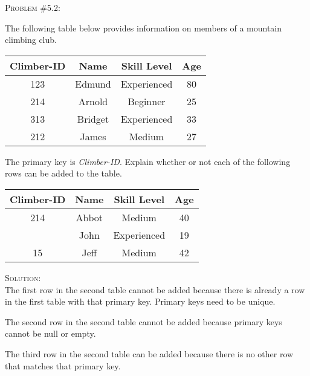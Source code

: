 \documentclass[12pt]{article}
\newenvironment{problem}[1]
{\begin{mdframed}[linewidth=0.8pt]
        \textsc{Problem #1:}

}
    {\end{mdframed}}
\newenvironment{solution}
    {\textsc{Solution:}\\}
    {\newpage}%
\begin{document}
	\begin{problem}{\#5.2}
		The following table below provides information on members of a mountain
		climbing club.
		\begin{center}
		\begin{tabular}{|c|c|c|c|}
			\hline
			\textbf{Climber-ID} & \textbf{Name} & \textbf{Skill Level} & \textbf{Age}\\
			\hline
			123 & Edmund & Experienced & 80\\
			\hline
			214 & Arnold & Beginner & 25\\
			\hline
			313 & Bridget & Experienced & 33\\
			\hline
			212 & James & Medium & 27\\
			\hline
		\end{tabular}
		\end{center}

		The primary key is \textit{Climber-ID}. Explain whether or not each of the
		following rows can be added to the table.
		\begin{center}
			\begin{tabular}{|c|c|c|c|}
				\hline				\textbf{Climber-ID} & \textbf{Name} & \textbf{Skill Level} & \textbf{Age}\\
				\hline
				214 & Abbot & Medium & 40\\
				\hline
				    & John & Experienced & 19\\
				\hline
				15 & Jeff & Medium & 42\\
				\hline
			\end{tabular}
		\end{center}
	\end{problem}
	\begin{solution}
		The first row in the second table cannot be added because there is already
		a row in the first table with that primary key. Primary keys need to be unique.

		The second row in the second table cannot be added because primary keys cannot
		be null or empty.

		The third row in the second table can be added because there is no other row
		that matches that primary key.
	\end{solution}
\end{document}
